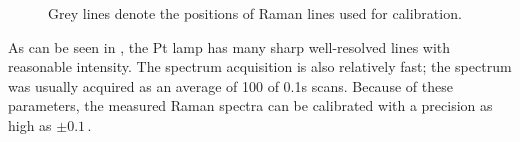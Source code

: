 \begin{figure}
	\centering
	
	\caption[%
		UV Raman spectrum of platinum hollow cathode lamp.%
	]{%
		Grey lines denote the positions of Raman lines used for calibration.
	}
	\label{\figlabel{wavenumber_calibration:pt_spc}}
\end{figure}

As can be seen in
,
the Pt lamp has many sharp well-resolved lines with reasonable intensity.
The spectrum acquisition is also relatively fast; the spectrum was usually
acquired as an average of 100 of 0.1s scans.
Because of these parameters, the measured Raman spectra can be calibrated with
a precision as high as $\pm0.1$\,\icm.

